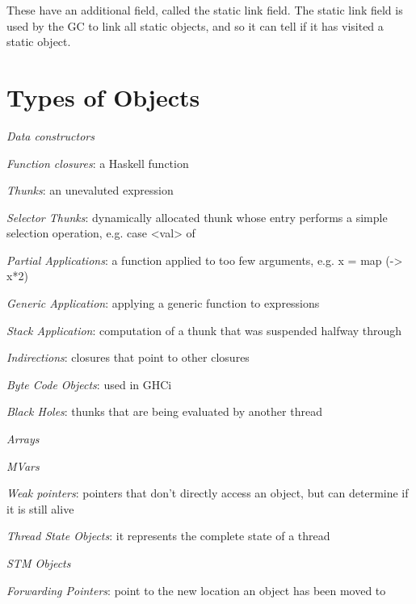 \documentclass[a4paper,11pt]{article}
\begin{document}
These have an additional field, called the static link field. The static link field is used by the GC to link all static objects, and so it can tell if it has visited a static object.

\section{Types of Objects}

\begin{description}
\item \textit{Data constructors}
\item \textit{Function closures}: a Haskell function
\item \textit{Thunks}: an unevaluted expression
\item \textit{Selector Thunks}: dynamically allocated thunk whose entry performs a simple selection operation, e.g. case <val> of
\item \textit{Partial Applications}: a function applied to too few arguments, e.g. x = map (\x -> x*2)
\item \textit{Generic Application}: applying a generic function to expressions
\item \textit{Stack Application}: computation of a thunk that was suspended halfway through
\item \textit{Indirections}: closures that point to other closures 
\item \textit{Byte Code Objects}: used in GHCi
\item \textit{Black Holes}: thunks that are being evaluated by another thread
\item \textit{Arrays}
\item \textit{MVars}
\item \textit{Weak pointers}: pointers that don't directly access an object, but can determine if it is still alive
\item \textit{Thread State Objects}: it represents the complete state of a thread
\item \textit{STM Objects}
\item \textit{Forwarding Pointers}: point to the new location an object has been moved to
\end{description}
\end{document}
